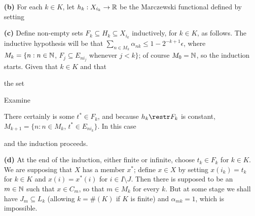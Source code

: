 {{\bf (b)} For each $k\in K$, let $h_k:X_{i_k}\to\Bbb R$ be the Marczewski
functional defined by setting



\medskip

{\bf (c)} Define non-empty sets
$F_k\subseteq H_k\subseteq X_{i_k}$ inductively, for $k\in K$,
as follows.   The inductive hypothesis will be that
$\sum_{n\in M_k}\alpha_{nk}\le 1-2^{-k+1}\epsilon$, where
$M_k=\{n:n\in\Bbb N$, $F_j\subseteq E_{ni_j}$ whenever $j<k\}$;
of course $M_0=\Bbb N$, so the induction starts.
Given that $k\in K$ and that


\noindent the set



Examine


\noindent There certainly is some $t^*\in F_k$, and because $h_k\restr F_k$
is constant, $M_{k+1}=\{n:n\in M_k$, $t^*\in E_{ni_k}\}$.   In this case


\noindent and the induction proceeds.

\medskip

{\bf (d)} At the end of the induction, either finite or infinite,
choose $t_k\in F_k$ for $k\in K$.   We are supposing that $X$ has a member
$x^*$;  define $x\in X$ by setting $x(i_k)=t_k$ for $k\in K$ and
$x(i)=x^*(i)$ for $i\in I\setminus J$.   Then there is supposed to be an
$m\in\Bbb N$ such that $x\in C_m$, so that $m\in M_k$ for every $k$.
But at some stage we shall have
$J_m\subseteq L_k$ (allowing $k=\#(K)$ if $K$ is finite) and
$\alpha_{mk}=1$, which is impossible.\ \Bang
}%

